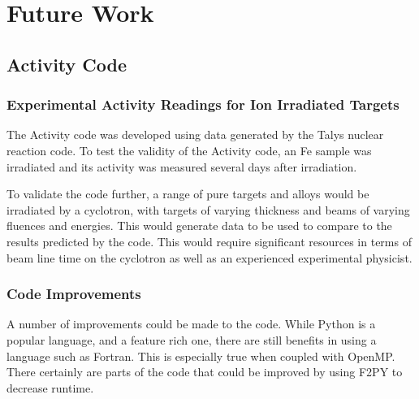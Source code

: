 \chapter{Future Work}
\label{chapter:futurework}

\begin{changemargin}{1.0cm}{1.0cm} 
\end{changemargin}


\section{Activity Code}

\subsection{Experimental Activity Readings for Ion Irradiated Targets}

The Activity code was developed using data generated by the Talys nuclear reaction code.  To test the validity of the Activity code, an \Gls{Fe} sample was irradiated and its activity was measured several days after irradiation.

To validate the code further, a range of pure targets and alloys would be irradiated by a cyclotron, with targets of varying thickness and beams of varying fluences and energies.  This would generate data to be used to compare to the results predicted by the code.  This would require significant resources in terms of beam line time on the cyclotron as well as an experienced experimental physicist.


\subsection{Code Improvements}

A number of improvements could be made to the code.  While Python is a popular language, and a feature rich one, there are still benefits in using a language such as Fortran.  This is especially true when coupled with OpenMP.  There certainly are parts of the code that could be improved by using F2PY to decrease runtime.

